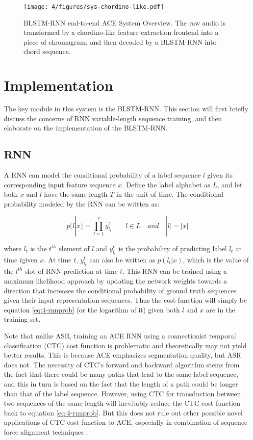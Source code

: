 \begin{figure}[htb]
\centering
\texttt{[image: 4/figures/sys-chordino-like.pdf]}
\caption{BLSTM-RNN end-to-end ACE System Overview. The raw audio is transformed by a chordino-like feature extraction frontend into a piece of chromagram, and then decoded by a BLSTM-RNN into chord sequence.}
\label{fig:4-sysover}
\end{figure}

\section{Implementation}\label{sec:4-blstm}
The key module in this system is the BLSTM-RNN. This section will first briefly discuss the concerns of RNN variable-length sequence training, and then elaborate on the implementation of the BLSTM-RNN.

\subsection{RNN}
A RNN can model the conditional probability of a label sequence $l$ given its corresponding input feature sequence $x$. Define the label alphabet as $L$, and let both $x$ and $l$ have the same length $T$ in the unit of time. The conditional probability modeled by the RNN can be written as:

\begin{equation}\label{eq:4-rnnprob}
p(l|x) = \prod_{t=1}^T y_{l_t}^t  \quad\quad l\in L \quad and \quad |l| = |x|
\end{equation}

where $l_t$ is the $t^{th}$ element of $l$ and $y_{l_t}^t$ is the probability of predicting label $l_t$ at time $t $given $x$. At time $t$, $y_{l_t}^t$ can also be written as $p(l_t|x)$, which is the value of the $l^{th}$ slot of RNN prediction at time $t$. This RNN can be trained using a maximum likelihood approach by updating the network weights towards a direction that increases the conditional probability of ground truth sequences given their input representation sequences. Thus the cost function will simply be equation \ref{eq:4-rnnprob} (or the logarithm of it) given both $l$ and $x$ are in the training set.

Note that unlike ASR, training an ACE RNN using a connectionist temporal classification (CTC) cost function \cite{graves2006connectionist} is problematic and theoretically may not yield better results. This is because ACE emphasizes segmentation quality, but ASR does not. The necessity of CTC's forward and backward algorithm stems from the fact that there could be many paths that lead to the same label sequence, and this in turn is based on the fact that the length of a path could be longer than that of the label sequence. However, using CTC for transduction between two sequences of the same length will inevitably reduce the CTC cost function back to equation \ref{eq:4-rnnprob}. But this does not rule out other possible novel applications of CTC cost function to ACE, especially in combination of sequence force alignment techniques \cite{sheh2003chord,mauch2010lyrics}.

